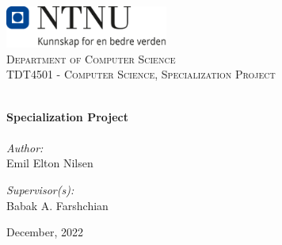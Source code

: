 
\begin{titlepage}
\vbox{ }
\vbox{ }
\begin{center}
\includegraphics[width=0.40\textwidth]{Images/NTNU_logo.png}\\[1cm]
\textsc{\LARGE Department of Computer Science}\\[1.5cm]
\textsc{\Large TDT4501 - Computer Science, Specialization Project}\\[0.5cm]
\vbox{ }

\HRule \\[0.4cm]
{ \huge \bfseries Specialization Project}\\[0.4cm]
\HRule \\[1.5cm]

\large
\emph{Author:}\\
Emil Elton Nilsen

\emph{Supervisor(s):}\\
Babak A. Farshchian
\vfill

{\large December, 2022}
\end{center}
\end{titlepage}